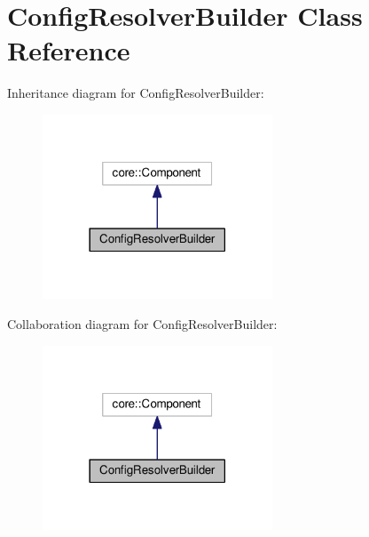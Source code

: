 \hypertarget{classConfigResolverBuilder}{}\section{Config\+Resolver\+Builder Class Reference}
\label{classConfigResolverBuilder}


Inheritance diagram for Config\+Resolver\+Builder\+:
\nopagebreak
\begin{figure}[H]
\begin{center}
\leavevmode
\includegraphics[width=194pt]{classConfigResolverBuilder__inherit__graph}
\end{center}
\end{figure}


Collaboration diagram for Config\+Resolver\+Builder\+:
\nopagebreak
\begin{figure}[H]
\begin{center}
\leavevmode
\includegraphics[width=194pt]{classConfigResolverBuilder__coll__graph}
\end{center}
\end{figure}
